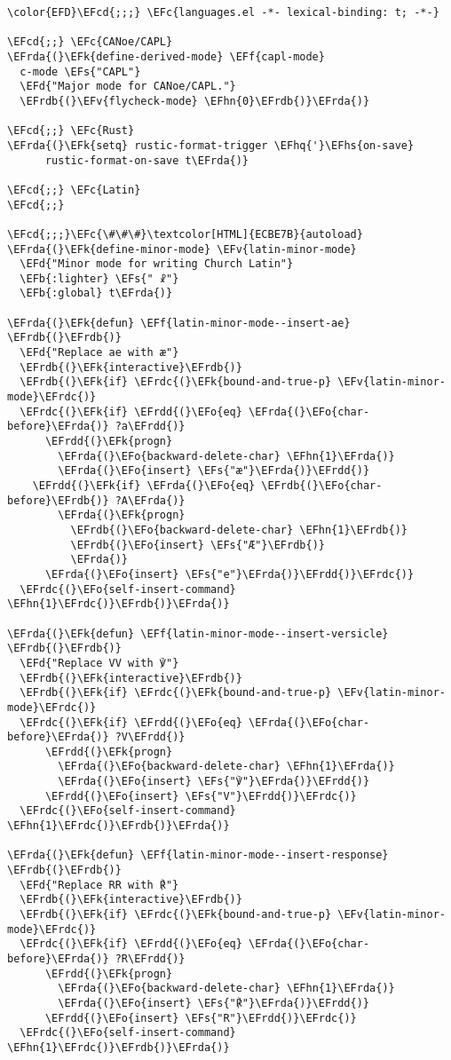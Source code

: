 \documentclass[a4wide,10pt]{article}
\newcommand{\EFc}[1]{\textcolor{EFc}{#1}} %
\newcommand{\EFcd}[1]{\textcolor{EFcd}{#1}} %
\newcommand{\EFs}[1]{\textcolor{EFs}{#1}} %
\newcommand{\EFd}[1]{\textcolor{EFd}{#1}} %
\newcommand{\EFk}[1]{\textcolor{EFk}{#1}} %
\newcommand{\EFb}[1]{\textcolor{EFb}{#1}} %
\newcommand{\EFf}[1]{\textcolor{EFf}{#1}} %
\newcommand{\EFv}[1]{\textcolor{EFv}{#1}} %
\newcommand{\EFo}[1]{\textcolor{EFo}{#1}} %
\newcommand{\EFhn}[1]{\textcolor{EFhn}{\textbf{#1}}} %
\newcommand{\EFhq}[1]{\textcolor{EFhq}{#1}} %
\newcommand{\EFhs}[1]{\textcolor{EFhs}{#1}} %
\newcommand{\EFrda}[1]{\textcolor{EFrda}{#1}} %
\newcommand{\EFrdb}[1]{\textcolor{EFrdb}{#1}} %
\newcommand{\EFrdc}[1]{\textcolor{EFrdc}{#1}} %
\newcommand{\EFrdd}[1]{\textcolor{EFrdd}{#1}} %
\begin{document}
\begin{Code}
\begin{Verbatim}
\color{EFD}\EFcd{;;;} \EFc{languages.el -*- lexical-binding: t; -*-}

\EFcd{;;} \EFc{CANoe/CAPL}
\EFrda{(}\EFk{define-derived-mode} \EFf{capl-mode}
  c-mode \EFs{"CAPL"}
  \EFd{"Major mode for CANoe/CAPL."}
  \EFrdb{(}\EFv{flycheck-mode} \EFhn{0}\EFrdb{)}\EFrda{)}

\EFcd{;;} \EFc{Rust}
\EFrda{(}\EFk{setq} rustic-format-trigger \EFhq{'}\EFhs{on-save}
      rustic-format-on-save t\EFrda{)}

\EFcd{;;} \EFc{Latin}
\EFcd{;;}

\EFcd{;;;}\EFc{\#\#\#}\textcolor[HTML]{ECBE7B}{autoload}
\EFrda{(}\EFk{define-minor-mode} \EFv{latin-minor-mode}
  \EFd{"Minor mode for writing Church Latin"}
  \EFb{:lighter} \EFs{" ☧"}
  \EFb{:global} t\EFrda{)}

\EFrda{(}\EFk{defun} \EFf{latin-minor-mode--insert-ae} \EFrdb{(}\EFrdb{)}
  \EFd{"Replace ae with æ"}
  \EFrdb{(}\EFk{interactive}\EFrdb{)}
  \EFrdb{(}\EFk{if} \EFrdc{(}\EFk{bound-and-true-p} \EFv{latin-minor-mode}\EFrdc{)}
  \EFrdc{(}\EFk{if} \EFrdd{(}\EFo{eq} \EFrda{(}\EFo{char-before}\EFrda{)} ?a\EFrdd{)}
      \EFrdd{(}\EFk{progn}
        \EFrda{(}\EFo{backward-delete-char} \EFhn{1}\EFrda{)}
        \EFrda{(}\EFo{insert} \EFs{"æ"}\EFrda{)}\EFrdd{)}
    \EFrdd{(}\EFk{if} \EFrda{(}\EFo{eq} \EFrdb{(}\EFo{char-before}\EFrdb{)} ?A\EFrda{)}
        \EFrda{(}\EFk{progn}
          \EFrdb{(}\EFo{backward-delete-char} \EFhn{1}\EFrdb{)}
          \EFrdb{(}\EFo{insert} \EFs{"Æ"}\EFrdb{)}
          \EFrda{)}
      \EFrda{(}\EFo{insert} \EFs{"e"}\EFrda{)}\EFrdd{)}\EFrdc{)}
  \EFrdc{(}\EFo{self-insert-command} \EFhn{1}\EFrdc{)}\EFrdb{)}\EFrda{)}

\EFrda{(}\EFk{defun} \EFf{latin-minor-mode--insert-versicle} \EFrdb{(}\EFrdb{)}
  \EFd{"Replace VV with ℣"}
  \EFrdb{(}\EFk{interactive}\EFrdb{)}
  \EFrdb{(}\EFk{if} \EFrdc{(}\EFk{bound-and-true-p} \EFv{latin-minor-mode}\EFrdc{)}
  \EFrdc{(}\EFk{if} \EFrdd{(}\EFo{eq} \EFrda{(}\EFo{char-before}\EFrda{)} ?V\EFrdd{)}
      \EFrdd{(}\EFk{progn}
        \EFrda{(}\EFo{backward-delete-char} \EFhn{1}\EFrda{)}
        \EFrda{(}\EFo{insert} \EFs{"℣"}\EFrda{)}\EFrdd{)}
      \EFrdd{(}\EFo{insert} \EFs{"V"}\EFrdd{)}\EFrdc{)}
  \EFrdc{(}\EFo{self-insert-command} \EFhn{1}\EFrdc{)}\EFrdb{)}\EFrda{)}

\EFrda{(}\EFk{defun} \EFf{latin-minor-mode--insert-response} \EFrdb{(}\EFrdb{)}
  \EFd{"Replace RR with ℟"}
  \EFrdb{(}\EFk{interactive}\EFrdb{)}
  \EFrdb{(}\EFk{if} \EFrdc{(}\EFk{bound-and-true-p} \EFv{latin-minor-mode}\EFrdc{)}
  \EFrdc{(}\EFk{if} \EFrdd{(}\EFo{eq} \EFrda{(}\EFo{char-before}\EFrda{)} ?R\EFrdd{)}
      \EFrdd{(}\EFk{progn}
        \EFrda{(}\EFo{backward-delete-char} \EFhn{1}\EFrda{)}
        \EFrda{(}\EFo{insert} \EFs{"℟"}\EFrda{)}\EFrdd{)}
      \EFrdd{(}\EFo{insert} \EFs{"R"}\EFrdd{)}\EFrdc{)}
  \EFrdc{(}\EFo{self-insert-command} \EFhn{1}\EFrdc{)}\EFrdb{)}\EFrda{)}




\end{Verbatim}
\end{Code}
\end{document}
